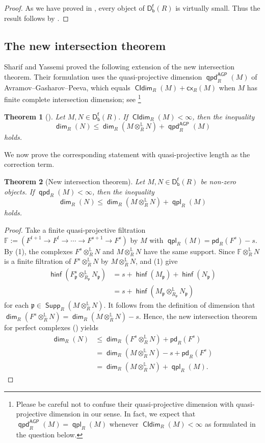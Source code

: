 \documentclass[10pt, a4paper,reqno]{amsart}
\newtheorem{thm}{Theorem}[section]
\theoremstyle{definition}
\theoremstyle{remark}
\numberwithin{equation}{thm}
\def\FF{\mathbb{F}}
\def\fp{\mathfrak{p}}
\def\dim{\operatorname{\mathsf{dim}}}
\def\Supp{\operatorname{\mathsf{Supp}}}
\def\Dfb{\mathsf{D^f_b}}
\def\ltensor{\otimes^{\mathbb{L}}}
\def\hinf{\operatorname{\mathsf{hinf}}}
\def\cx{\mathsf{cx}}
\def\CIdim{\operatorname{\mathsf{CIdim}}}
\def\pd{\mathsf{pd}}
\def\qpd{\operatorname{\mathsf{qpd}}}
\def\qpl{\operatorname{\mathsf{qpl}}}
\begin{document}
\begin{proof}
As we have proved in , every object of $\Dfb(R)$ is virtually small.
Thus the result follows by \cite[Theorem 5.2]{Pol}.
\end{proof}


\subsection{The new intersection theorem}

Sharif and Yassemi proved the following extension of the new intersection theorem.
Their formulation uses the quasi-projective dimension $\qpd_R^{\mathsf{AGP}}(M)$ of Avramov–Gasharov–Peeva, which equals $\CIdim_R(M) + \cx_R(M)$ when $M$ has finite complete intersection dimension; see \cite[Theorem 5.11]{AGP}\footnote{Please be careful not to confuse their quasi-projective dimension with quasi-projective dimension in our sense. In fact, we expect that $\qpd_R^{\mathsf{AGP}}(M) = \qpl_R(M)$ whenever $\CIdim_R(M) < \infty$ as formulated in the question below.}

\begin{thm}[{\cite[Theorem~3.3]{SY}}]\label{thm:SY}
Let $M,N \in \Dfb(R)$.
If $\CIdim_R(M) < \infty$, then the inequality
\[
\dim_R(N) \le \dim_R(M\ltensor_R N) + \qpd_R^{\mathsf{AGP}}(M)
\]	
holds.
\end{thm}

We now prove the corresponding statement with quasi-projective length as the correction term.

\begin{thm}[New intersection theorem]\label{NIT}
Let $M,N\in\Dfb(R)$ be non-zero objects.
If $\qpd_R(M) < \infty$, then the inequality 
\[
\dim_R(N) \le \dim_R(M\ltensor_R N)+\qpl_R(M)
\] 
holds.
\end{thm}

\begin{proof}
Take a finite quasi-projective filtration $\FF := (F^{t+1} \to F^t \to \cdots \to F^{s+1} \to F^s)$ by $M$ with $\qpl_R(M) = \pd_R(F^s) -s$.
By (1), the complexes $F^s \ltensor_R N$ and $M\ltensor_R N$ have the same support.
Since $\FF \ltensor_R N$ is a finite filtration of $F^s \ltensor_R N$ by $M \ltensor_R N$, \cite[Corollary A.4.16]{Gbook} and (1) give
\begin{align*}
 \hinf(F^s_\fp\ltensor_{R_\fp}N_\fp)
 &=s + \hinf (M_\fp) + \hinf (N_\fp)\\
 &=s + \hinf(M_\fp\ltensor_{R_\fp}N_\fp)
\end{align*}
for each $\fp \in \Supp_R(M\ltensor_R N)$.
It follows from the definition of dimension that $\dim_R(F^s \ltensor_R N) = \dim_R(M\ltensor_R N) - s$.
Hence, the new intersection theorem for perfect complexes (\cite[Corollary 18.5.5]{CFH}) yields
\begin{align*}
\dim_R(N) &\le \dim_R(F^s \ltensor_R N) + \pd_R(F^s) \\
&= \dim_R(M\ltensor_R N) - s + \pd_R(F^s) \\
&= \dim_R(M\ltensor_R N) + \qpl_R(M).
\end{align*}
\end{proof}
\end{document}
